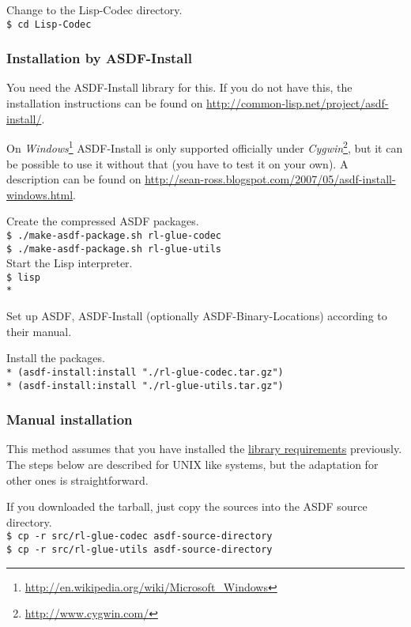 \documentclass[11pt,a4paper,dvipdfm]{article}
\newcommand{\selfref}[1]{\href{#1}{#1}}
\newcommand{\footref}[2]{\textsl{#1}\footnote{\selfref{#2}}}
\newcommand{\prompttext}[1]{\texttt{#1}}
\newcommand{\shprompt}[1]{\prompttext{\$ #1}}
\newcommand{\lispprompt}[1]{\prompttext{* #1}}
\begin{document}
Change to the Lisp-Codec directory. \\
\shprompt{cd Lisp-Codec}

\hypertarget{asdfinst}{\subsubsection{Installation by ASDF-Install}}

You need the ASDF-Install library for this. If you do not have this, the
installation instructions can be found on
\selfref{http://common-lisp.net/project/asdf-install/}.

On \footref{Windows}{http://en.wikipedia.org/wiki/Microsoft\_Windows}
ASDF-Install is only supported officially under
\footref{Cygwin}{http://www.cygwin.com/}, but it can be possible to use it
without that (you have to test it on your own). A description can be found on
\selfref{http://sean-ross.blogspot.com/2007/05/asdf-install-windows.html}.

Create the compressed ASDF packages. \\
\shprompt{./make-asdf-package.sh rl-glue-codec} \\
\shprompt{./make-asdf-package.sh rl-glue-utils} \\

Start the Lisp interpreter. \\
\shprompt{lisp} \\
\lispprompt{}

Set up ASDF, ASDF-Install (optionally ASDF-Binary-Locations) according to
their manual.

Install the packages. \\
\lispprompt{(asdf-install:install "./rl-glue-codec.tar.gz")} \\
\lispprompt{(asdf-install:install "./rl-glue-utils.tar.gz")}

\subsubsection{Manual installation}

This method assumes that you have installed the
\hyperlink{softreqs}{library requirements} previously. The steps below are
described for UNIX like systems, but the adaptation for other ones is
straightforward.

If you downloaded the tarball, just copy the sources into the ASDF source
directory. \\
\shprompt{cp -r src/rl-glue-codec asdf-source-directory} \\
\shprompt{cp -r src/rl-glue-utils asdf-source-directory}
\end{document}
